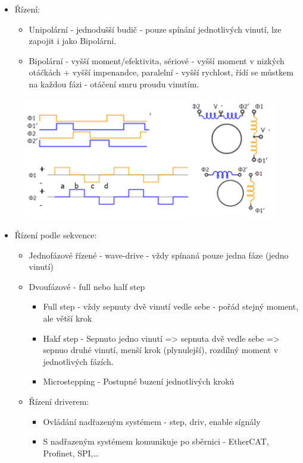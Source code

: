 \begin{itemize}
  \item Řízení: \begin{itemize}
    \item Unipolární - jednodušší budič - pouze spínání jednotlivých vinutí, lze zapojit i jako Bipolární.
    \item Bipolární - vyšší moment/efektivita, sériové - vyšší moment v nizkých otáčkách + vyšší impenandce, paralelní - vyšší rychlost, řídí se můstkem na každou fázi - otáčení smru proudu vinutím.
  \end{itemize}
\end{itemize}

\begin{figure}[h]
  \begin{center}
    \includegraphics[scale = 1]{img/Picture9.png}
  \end{center}
\end{figure}

\begin{itemize}
  \item Řízení podle sekvence: \begin{itemize}
    \item Jednofázové řízené - wave-drive - vždy spínaná pouze jedna fáze (jedno vinutí)
    \item Dvoufázové - full nebo half step\begin{itemize}
      \item Full step - vždy sepnuty dvě vinutí vedle sebe - pořád stejný moment, ale větší krok
      \item Hakf step - Sepnuto jedno vinutí => sepnuta dvě vedle sebe => sepnuo druhé vinutí, menší krok (plynulejší), rozdílný moment v jednotlivých fázích.
      \item Microstepping - Postupné buzení jednotlivých kroků
    \end{itemize}
  \item Řízení driverem: \begin{itemize}
    \item Ovládání nadřazeným systémem - step, driv, enable sígnály
    \item S nadřazeným systémem komunikuje po sběrnici - EtherCAT, Profinet, SPI,\dots
  \end{itemize}
  \end{itemize}
\end{itemize}

